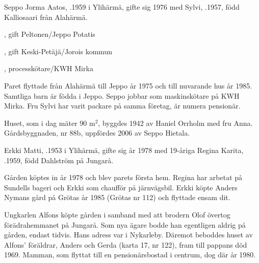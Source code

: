 


Seppo Jorma Aatos, .1959 i Ylihärmä, gifte sig 1976 med Sylvi, .1957,	född Kalliosaari från Alahärmä.
\begin{jhchildren}
  \item {}, gift Peltonen/Jeppo Potatis
  \item {}, gift Keski-Petäjä/Jorois kommun
  \item {}, processkötare/KWH Mirka
\end{jhchildren}

Paret flyttade från Alahärmä till Jeppo år 1975 och till nuvarande hus år 1985. Samtliga barn är födda i Jeppo. Seppo jobbar som maskinskötare på KWH Mirka. Fru Sylvi har varit packare på samma företag, är numera pensionär.

Huset, som i dag mäter 90 m$^2$, byggdes 1942 av Haniel Orrholm med fru Anna. Gårdsbyggnaden, nr 88b, uppfördes 2006 av Seppo Hietala.


Erkki Matti, .1953 i Ylihärmä, gifte sig år 1978 med 19-åriga Regina Karita, .1959, född Dahlström på Jungarå.
\begin{jhchildren}
  \item {}
  \item {}
\end{jhchildren}
Gården köptes in år 1978 och blev parets första hem. Regina har arbetat på Sundells bageri och Erkki som chaufför på järnvägsbil. Erkki köpte Anders Nymans gård på Grötas år 1985 (Grötas nr 112) och flyttade ensam dit.


Ungkarlen Alfons köpte gården i samband med att brodern Olof övertog förädrahemmanet på Jungarå. Som nya ägare bodde han egentligen aldrig på gården, endast tidvis. Hans adress var i Nykarleby. Däremot beboddes huset av Alfons' föräldrar, Anders och Gerda (karta 17, nr 122), fram till pappans död 1969. Mamman, som flyttat till en pensionärsbostad i centrum, dog där år 1980.

